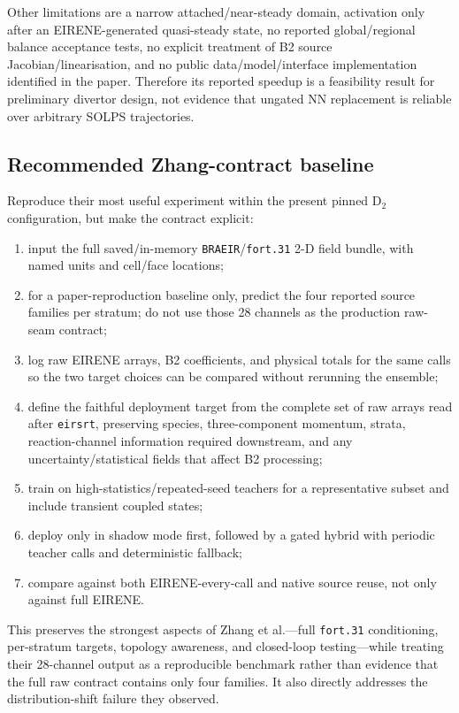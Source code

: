 \documentclass[11pt]{article}
\begin{document}
Other limitations are a narrow attached/near-steady domain, activation only after an EIRENE-generated quasi-steady state, no reported global/regional balance acceptance tests, no explicit treatment of B2 source Jacobian/linearisation, and no public data/model/interface implementation identified in the paper. Therefore its reported speedup is a feasibility result for preliminary divertor design, not evidence that ungated NN replacement is reliable over arbitrary SOLPS trajectories.

\subsection{Recommended Zhang-contract baseline}

Reproduce their most useful experiment within the present pinned D$_2$ configuration, but make the contract explicit:

\begin{enumerate}
\item input the full saved/in-memory \texttt{BRAEIR}/\texttt{fort.31} 2-D field bundle, with named units and cell/face locations;
\item for a paper-reproduction baseline only, predict the four reported source families per stratum; do not use those 28 channels as the production raw-seam contract;
\item log raw EIRENE arrays, B2 coefficients, and physical totals for the same calls so the two target choices can be compared without rerunning the ensemble;
\item define the faithful deployment target from the complete set of raw arrays read after \texttt{eirsrt}, preserving species, three-component momentum, strata, reaction-channel information required downstream, and any uncertainty/statistical fields that affect B2 processing;
\item train on high-statistics/repeated-seed teachers for a representative subset and include transient coupled states;
\item deploy only in shadow mode first, followed by a gated hybrid with periodic teacher calls and deterministic fallback;
\item compare against both EIRENE-every-call and native source reuse, not only against full EIRENE.
\end{enumerate}

This preserves the strongest aspects of Zhang et al.---full \texttt{fort.31} conditioning, per-stratum targets, topology awareness, and closed-loop testing---while treating their 28-channel output as a reproducible benchmark rather than evidence that the full raw contract contains only four families. It also directly addresses the distribution-shift failure they observed.
\end{document}
